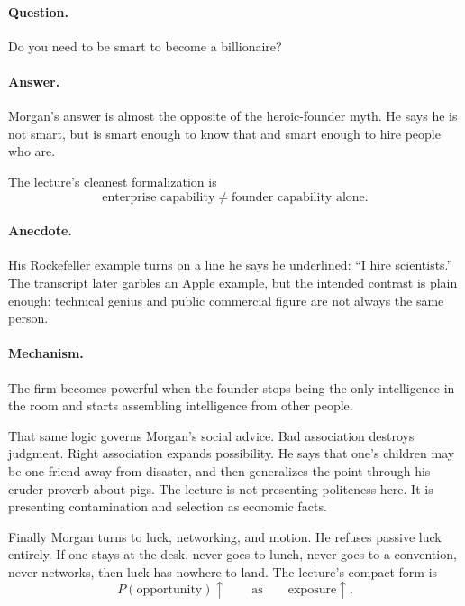 \paragraph{Question.}
Do you need to be smart to become a billionaire?

\paragraph{Answer.}
Morgan's answer is almost the opposite of the heroic-founder myth. He says he is not smart, but is smart enough to know that and smart enough to hire people who are.

The lecture's cleanest formalization is
\begin{equation}
\text{enterprise capability} \neq \text{founder capability alone}.
\end{equation}

\paragraph{Anecdote.}
His Rockefeller example turns on a line he says he underlined: ``I hire scientists.'' The transcript later garbles an Apple example, but the intended contrast is plain enough: technical genius and public commercial figure are not always the same person.

\paragraph{Mechanism.}
The firm becomes powerful when the founder stops being the only intelligence in the room and starts assembling intelligence from other people.

That same logic governs Morgan's social advice. Bad association destroys judgment. Right association expands possibility. He says that one's children may be one friend away from disaster, and then generalizes the point through his cruder proverb about pigs. The lecture is not presenting politeness here. It is presenting contamination and selection as economic facts.

Finally Morgan turns to luck, networking, and motion. He refuses passive luck entirely. If one stays at the desk, never goes to lunch, never goes to a convention, never networks, then luck has nowhere to land. The lecture's compact form is
\begin{equation}
P(\text{opportunity}) \uparrow
\qquad \text{as} \qquad
\text{exposure} \uparrow .
\end{equation}

